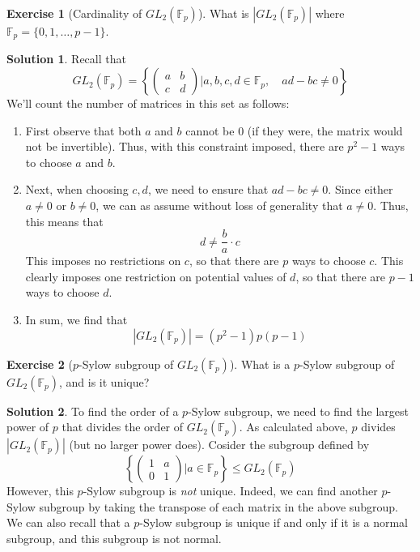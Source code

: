 \documentclass[12pt]{article}
\theoremstyle{definition}
\newtheorem{exercise}{\color{YellowOrange}Exercise}
\theoremstyle{definition}
\newtheorem{solution}{\color{Goldenrod}Solution}
\begin{document}
\begin{exercise}[Cardinality of $GL_2(\mathbb{F}_p)$]
	What is $|GL_2(\mathbb{F}_p)|$ where $\mathbb{F}_p = \{0,1,\ldots,p-1\}$.
\end{exercise}
\begin{solution}
	Recall that 
	\begin{equation}
		GL_2(\mathbb{F}_p) = \left\{
		\begin{pmatrix}
		a & b \\
		c & d
		\end{pmatrix}
		\bigg\vert
		a,b,c,d \in \mathbb{F}_p, \quad ad-bc \neq 0
		\right\}
	\end{equation}
	We'll count the number of matrices in this set as follows:
	\begin{enumerate}
		\item First observe that both $a$ and $b$ cannot be 0 (if they were, the matrix would not be invertible). Thus, with this constraint imposed, there are $p^2 -1$ ways to choose $a$ and $b$. 
		\item Next, when choosing $c,d$, we need to ensure that $ad - bc \neq 0$. Since either $a \neq 0$ or $b \neq 0$, we can as assume without loss of generality that $a \neq 0$. Thus, this means that 
		\begin{equation}
			d \neq \frac{b}{a} \cdot c
		\end{equation}
		This imposes no restrictions on $c$, so that there are $p$ ways to choose $c$. This clearly imposes one restriction on potential values of $d$, so that there are $p-1$ ways to choose $d$. 
		\item In sum, we find that
		\begin{equation}
			|GL_2(\mathbb{F}_p)| = (p^2 - 1)p(p-1)
		\end{equation}
	\end{enumerate}
\end{solution}

\begin{exercise}[$p$-Sylow subgroup of $GL_2(\mathbb{F}_p)$]
	What is a $p$-Sylow subgroup of $GL_2(\mathbb{F}_p)$, and is it unique?
\end{exercise}
\begin{solution}
	To find the order of a $p$-Sylow subgroup, we need to find the largest power of $p$ that divides the order of 
	$GL_2(\mathbb{F}_p)$. As calculated above, $p$ divides $|GL_2(\mathbb{F}_p)|$ (but no larger power does). Cosider the subgroup defined by
	\begin{equation}
		\left\{
		\begin{pmatrix}
		1 & a \\
		0 & 1
		\end{pmatrix}
		\bigg\vert 
		a \in \mathbb{F}_p
		\right\} \leq
		GL_2(\mathbb{F}_p)
	\end{equation}
	However, this $p$-Sylow subgroup is \emph{not} unique. Indeed, we can find another $p$-Sylow subgroup by taking the transpose of each matrix in the above subgroup. We can also recall that a $p$-Sylow subgroup is unique if and only if it is a normal subgroup, and this subgroup is not normal. 
\end{solution}
\end{document}
